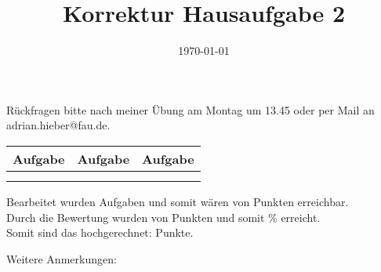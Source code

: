 \documentclass[11pt,a4paper]{article}
\title{Korrektur Hausaufgabe 2}
\date{\today}
\begin{document}
\maketitle

\begin{center}
    Rückfragen bitte nach meiner Übung am Montag um 13.45 oder per Mail an adrian.hieber@fau.de.
\end{center}

\vspace{2cm}

\begin{center}
    \begin{tabular}[h]{l|c|r}
    Aufgabe\qquad \qquad& Aufgabe\qquad \qquad& Aufgabe\qquad \qquad\\
    \hline
      &   &   \\
      & & \\
    \end{tabular}
\end{center}

\vspace{1cm}

\begin{center}
Bearbeitet wurden Aufgaben \qquad \qquad \quad und somit wären \qquad \quad von \qquad \quad Punkten erreichbar.\\
\vspace{0.6cm}
Durch die Bewertung wurden \qquad \quad von \qquad \quad Punkten und somit \qquad \quad\% erreicht.\\
\vspace{0.6cm}
Somit sind das hochgerechnet: \qquad \quad Punkte.\\

\end{center}
\vspace{2cm}

Weitere Anmerkungen:
\end{document}
